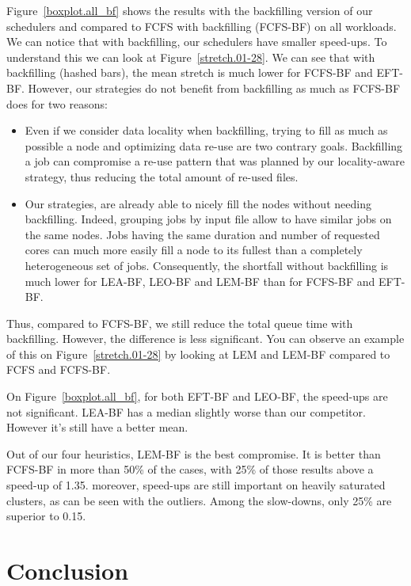 \documentclass[conference,10pt]{IEEEtran}
\begin{document}
Figure~\ref{boxplot.all_bf} shows the results with the backfilling version of our
schedulers and compared to FCFS with backfilling (FCFS-BF) on all workloads.
We can notice that with backfilling, our schedulers have smaller speed-ups.
To understand this we can look at Figure~\ref{stretch.01-28}. We can see that 
with backfilling (hashed bars), the mean stretch is much lower for FCFS-BF and EFT-BF. 
However, our strategies do not benefit from backfilling as much as FCFS-BF does for two reasons:
\begin{itemize}
	\item Even if we consider data locality when backfilling, trying to fill as much as possible a node and optimizing data re-use are two contrary goals. 
	Backfilling a job can compromise a re-use pattern that was planned by our locality-aware strategy, thus reducing the total 
	amount of re-used files.
	\item Our strategies, are already able to nicely fill the nodes without needing backfilling.
	Indeed, grouping jobs by input file allow to have similar jobs on the same nodes.
	Jobs having the same duration and number of requested cores can much more easily fill a node to its fullest than a completely heterogeneous set of jobs.
	Consequently, the shortfall without backfilling is much lower for LEA-BF, LEO-BF and LEM-BF than for FCFS-BF and EFT-BF.
\end{itemize}
Thus, compared to FCFS-BF, we still reduce the total queue time with backfilling.
However, the difference is less significant. You can observe an example of this
on Figure~\ref{stretch.01-28} by looking at LEM and LEM-BF compared to FCFS and FCFS-BF.

On Figure~\ref{boxplot.all_bf}, for both EFT-BF and LEO-BF, the speed-ups are not significant.
LEA-BF has a median slightly worse than our competitor. However it's still have a better mean.

Out of our four heuristics, LEM-BF is the best compromise.
It is better than FCFS-BF in more than 50\% of the cases, 
with 25\% of those results above a speed-up of 1.35.
moreover, speed-ups are still important on heavily saturated clusters, as can be seen with the outliers.
Among the slow-downs, only 25\% are superior to 0.15.


\section{Conclusion}\label{sec.conclusion}




\end{document}
